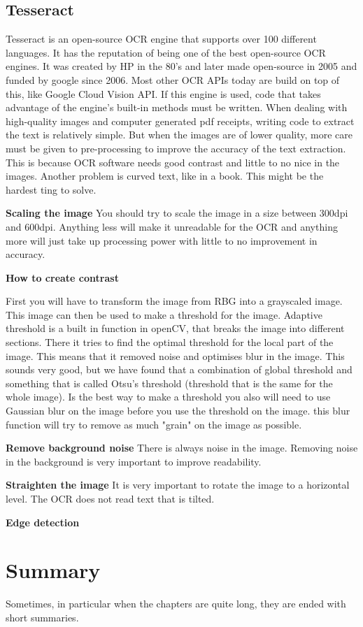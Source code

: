\subsection{Tesseract}\label{subsec:Tesseract}
Tesseract is an open-source OCR engine that supports over 100 different languages.
It has the reputation of being one of the best open-source OCR engines.
It was created by HP in the 80's and later made open-source in 2005 and funded by google since 2006.
Most other OCR APIs today are build on top of this, like Google Cloud Vision API.
If this engine is used, code that takes advantage of the engine's built-in methods must be written.
When dealing with high-quality images and computer generated pdf receipts, writing code to extract the text is relatively simple.
But when the images are of lower quality, more care must be given to pre-processing to improve the accuracy of the text extraction.
This is because OCR software needs good contrast and little to no nice in the images.
Another problem is curved text, like in a book.
This might be the hardest ting to solve.

\textbf{Scaling the image}
You should try to scale the image in a size between 300dpi and 600dpi.
Anything less will make it unreadable for the OCR and anything more will just take up processing power with little to no improvement in accuracy.

\textbf{How to create contrast}


First you will have to transform the image from RBG into a grayscaled image.
This image can then be used to make a threshold for the image.
Adaptive threshold is a built in function in openCV, that breaks the image into different sections.
There it tries to find the optimal threshold for the local part of the image.
This means that it removed noise and optimises blur in the image.
This sounds very good, but we have found that a combination of global threshold and something that is called Otsu's threshold (threshold that is the same for the whole image).
Is the best way to make a threshold you also will need to use Gaussian blur on the image before you use the threshold on the image.
this blur function will try to remove as much "grain" on the image as possible.

\textbf{Remove background noise}
There is always noise in the image.
Removing noise in the background is very important to improve readability.

\textbf{Straighten the image}
It is very important to rotate the image to a horizontal level.
The OCR does not read text that is tilted.

\textbf{Edge detection}

\section{Summary}\label{sec:summary}

Sometimes, in particular when the chapters are quite long, they are ended with short summaries.

